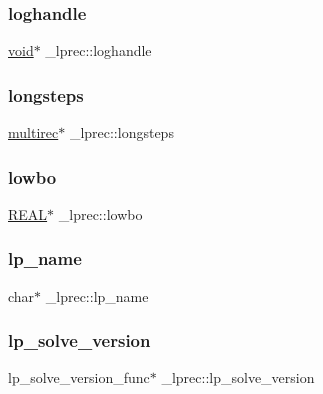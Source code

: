 \subsubsection{\texorpdfstring{loghandle}{loghandle}}
{\footnotesize\ttfamily \hyperlink{lp__lib_8h_ac7828c7b2b31d2e11af17bdb6289c5d9}{void}$\ast$ \+\_\+lprec\+::loghandle}

\mbox{\label{struct__lprec_ad7fecdf6d13cc2a5140e3dca828ff320}} 
\subsubsection{\texorpdfstring{longsteps}{longsteps}}
{\footnotesize\ttfamily \hyperlink{lp__types_8h_ac33fb087dc930f73c480e6aa191225c6}{multirec}$\ast$ \+\_\+lprec\+::longsteps}

\mbox{\label{struct__lprec_a38131a07d2b65ca5ddca0cce3c96d4e7}} 
\subsubsection{\texorpdfstring{lowbo}{lowbo}}
{\footnotesize\ttfamily \hyperlink{lp__lib_8h_a92bd5e363d131fa73669358edb232dce}{R\+E\+AL}$\ast$ \+\_\+lprec\+::lowbo}

\mbox{\label{struct__lprec_a36877d6e27b4800b47f91f5ac07f1c8d}} 
\subsubsection{\texorpdfstring{lp\+\_\+name}{lp\_name}}
{\footnotesize\ttfamily char$\ast$ \+\_\+lprec\+::lp\+\_\+name}

\mbox{\label{struct__lprec_a9057c9984709b15b8cb254500fff0dd2}} 
\subsubsection{\texorpdfstring{lp\+\_\+solve\+\_\+version}{lp\_solve\_version}}
{\footnotesize\ttfamily lp\+\_\+solve\+\_\+version\+\_\+func$\ast$ \+\_\+lprec\+::lp\+\_\+solve\+\_\+version}


